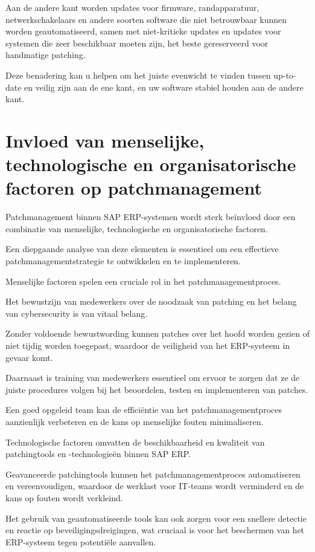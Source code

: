  Aan de andere kant worden updates voor firmware, randapparatuur, netwerkschakelaars en andere soorten software die niet betrouwbaar kunnen worden geautomatiseerd, samen met niet-kritieke updates en updates voor systemen die zeer beschikbaar moeten zijn, het beste gereserveerd voor handmatige patching.

 Deze benadering kan u helpen om het juiste evenwicht te vinden tussen up-to-date en veilig zijn aan de ene kant, en uw software stabiel houden aan de andere kant.



\section{Invloed van menselijke, technologische en organisatorische factoren op patchmanagement}
Patchmanagement binnen SAP ERP-systemen wordt sterk beïnvloed door een combinatie van menselijke, technologische en organisatorische factoren.

 Een diepgaande analyse van deze elementen is essentieel om een effectieve patchmanagementstrategie te ontwikkelen en te implementeren.


Menselijke factoren spelen een cruciale rol in het patchmanagementproces.

 Het bewustzijn van medewerkers over de noodzaak van patching en het belang van cybersecurity is van vitaal belang.

 Zonder voldoende bewustwording kunnen patches over het hoofd worden gezien of niet tijdig worden toegepast, waardoor de veiligheid van het ERP-systeem in gevaar komt.

 Daarnaast is training van medewerkers essentieel om ervoor te zorgen dat ze de juiste procedures volgen bij het beoordelen, testen en implementeren van patches.

 Een goed opgeleid team kan de efficiëntie van het patchmanagementproces aanzienlijk verbeteren en de kans op menselijke fouten minimaliseren.



Technologische factoren omvatten de beschikbaarheid en kwaliteit van patchingtools en -technologieën binnen SAP ERP.

 Geavanceerde patchingtools kunnen het patchmanagementproces automatiseren en vereenvoudigen, waardoor de werklast voor IT-teams wordt verminderd en de kans op fouten wordt verkleind.

 Het gebruik van geautomatiseerde tools kan ook zorgen voor een snellere detectie en reactie op beveiligingsdreigingen, wat cruciaal is voor het beschermen van het ERP-systeem tegen potentiële aanvallen.



